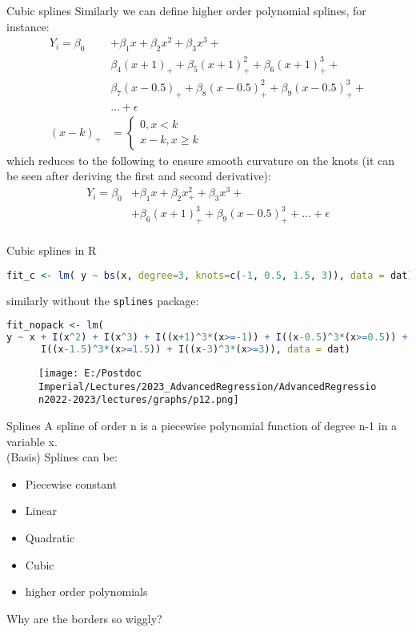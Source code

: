 \documentclass{beamer}
\begin{document}
\begin{frame}[fragile]{Cubic splines}
	Similarly we can define higher order polynomial splines, for instance:
	\begin{align*}
	Y_i = \beta_0 &+ \beta_1 x +  \beta_2x^2 + \beta_3x^3 + \\
	 &\beta_4 (x+1)_+ +\beta_5 (x+1)_+^2 +\beta_6 (x+1)_+^3 +\\ 
	 &\beta_7 (x-0.5)_+ +\beta_8 (x-0.5)_+^2 +\beta_9 (x-0.5)_+^3 + \\ & \dots + \epsilon \\
	(x-k)_+& = 
	\begin{cases}
	0, x<k \\
	x-k, x\geq k \end{cases}
	\end{align*}
	which reduces to the following to ensure smooth curvature on the knots (it can be seen after deriving the first and second derivative):
	\begin{align*}
	Y_i = \beta_0 &+ \beta_1 x +  \beta_2x^2_+ + \beta_3x^3 + \\
	&+\beta_6 (x+1)_+^3 + \beta_9 (x-0.5)_+^3 +  \dots + \epsilon \\
	\end{align*}
	
\end{frame}


\begin{frame}[fragile]{Cubic splines in R}
	\begin{lstlisting}[language=R, basicstyle=\tiny]
fit_c <- lm( y ~ bs(x, degree=3, knots=c(-1, 0.5, 1.5, 3)), data = dat)
	\end{lstlisting}
	
	similarly without the \texttt{splines} package:
	
	\begin{lstlisting}[language=R, basicstyle=\tiny]
fit_nopack <- lm(
y ~ x + I(x^2) + I(x^3) + I((x+1)^3*(x>=-1)) + I((x-0.5)^3*(x>=0.5)) +
      I((x-1.5)^3*(x>=1.5)) + I((x-3)^3*(x>=3)), data = dat)
	\end{lstlisting}
	
	\begin{figure}
		\centering	
		\texttt{[image: E:/Postdoc Imperial/Lectures/2023\_AdvancedRegression/AdvancedRegression2022-2023/lectures/graphs/p12.png]}	
	\end{figure}
\end{frame}


\begin{frame}[fragile]{Splines}
	 A spline of order n is a piecewise polynomial function of degree 
	n-1 in a variable x.\\
	(Basis) Splines can be:
\begin{itemize}
	\item Piecewise constant
	\item Linear
	\item Quadratic
	\item Cubic
	\item higher order polynomials
\end{itemize}
Why are the borders so wiggly?
\end{frame}
\end{document}
